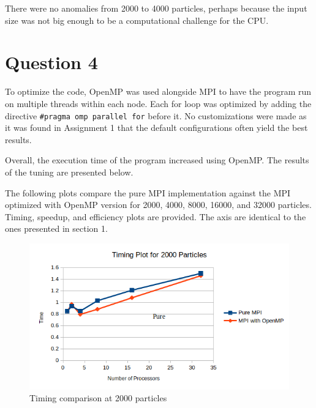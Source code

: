 \documentclass{article}
\begin{document}
There were no anomalies from 2000 to 4000 particles, perhaps because the input size was not big enough to be a computational challenge for the CPU.

\section{Question 4}
To optimize the code, OpenMP was used alongside MPI to have the program run on multiple threads within each node. Each for loop was optimized by adding the directive \texttt{\#pragma omp parallel for} before it. No customizations were made as it was found in Assignment 1 that the default configurations often yield the best results. 

Overall, the execution time of the program increased using OpenMP. The results of the tuning are presented below.

The following plots compare the pure MPI implementation against the MPI optimized with OpenMP version for 2000, 4000, 8000, 16000, and 32000 particles. Timing, speedup, and efficiency plots are provided. The axis are identical to the ones presented in section 1.

\begin{figure}[H]
	\begin{center}
		\hspace*{-0.5cm}                                                           
  		\includegraphics[scale=0.7]{Report_Assets/timing2000.png}
  	\end{center}
  	\caption{Timing comparison at 2000 particles}
\end{figure}
\end{document}
